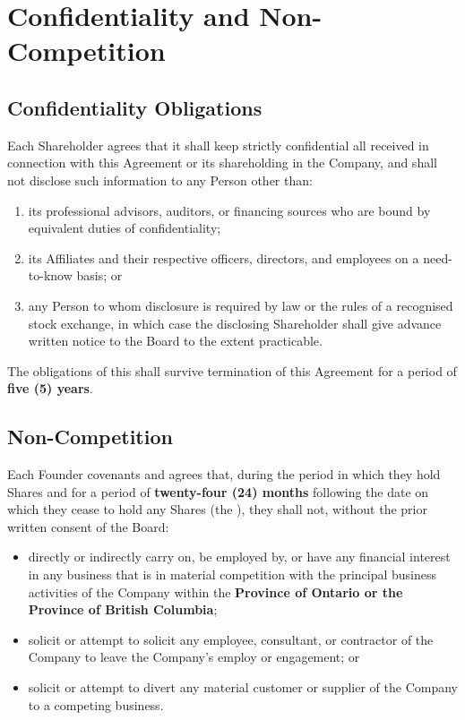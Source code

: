 
\section{Confidentiality and Non-Competition}
\label{sec:confidentiality}

\subsection{Confidentiality Obligations}

Each Shareholder agrees that it shall keep strictly confidential all
 received in connection with this Agreement
or its shareholding in the Company, and shall not disclose such information to
any Person other than:
\begin{enumerate}[label=\lbrack\alph*\rbrack, leftmargin=2em, itemsep=3pt]
  \item its professional advisors, auditors, or financing sources who are bound
        by equivalent duties of confidentiality;
  \item its Affiliates and their respective officers, directors, and employees
        on a need-to-know basis; or
  \item any Person to whom disclosure is required by law or the rules of a
        recognised stock exchange, in which case the disclosing Shareholder shall
        give advance written notice to the Board to the extent practicable.
\end{enumerate}

The obligations of this  shall survive termination of this Agreement
for a period of \textbf{five (5) years}.

\subsection{Non-Competition}

Each Founder covenants and agrees that, during the period in which they hold
Shares and for a period of \textbf{twenty-four (24) months} following the date on
which they cease to hold any Shares (the ), they shall
not, without the prior written consent of the Board:
\begin{itemize}[itemsep=3pt]
  \item directly or indirectly carry on, be employed by, or have any financial
        interest in any business that is in material competition with the principal
        business activities of the Company within the \textbf{Province of Ontario
        or the Province of British Columbia};
  \item solicit or attempt to solicit any employee, consultant, or contractor of
        the Company to leave the Company's employ or engagement; or
  \item solicit or attempt to divert any material customer or supplier of the
        Company to a competing business.
\end{itemize}

